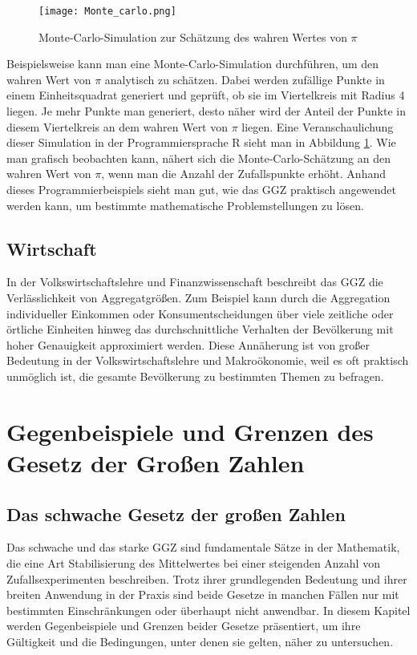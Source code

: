 \documentclass[12pt,a4paper]{article}
\begin{document}
\begin{figure}[h!]
  \centering
  \texttt{[image: Monte\_carlo.png]}
  \caption{Monte-Carlo-Simulation zur Schätzung des wahren Wertes von \texorpdfstring{$\pi$}{π}}
  \label{fig:monte_carlo}
\end{figure}


Beispielsweise kann man eine Monte-Carlo-Simulation durchführen, um den wahren Wert von \texorpdfstring{$\pi$}{π} analytisch zu schätzen.
Dabei werden zufällige Punkte in einem Einheitsquadrat generiert und geprüft, ob sie im Viertelkreis mit Radius 4 liegen.
Je mehr Punkte man generiert, desto näher wird der Anteil der Punkte in diesem Viertelkreis an dem wahren Wert von \texorpdfstring{$\pi$}{π} liegen.
Eine Veranschaulichung dieser Simulation in der Programmiersprache R sieht man in Abbildung \ref{fig:monte_carlo}.
Wie man grafisch beobachten kann, nähert sich die Monte-Carlo-Schätzung an den wahren Wert von \texorpdfstring{$\pi$}{π}, wenn man die Anzahl der Zufallspunkte erhöht.
Anhand dieses Programmierbeispiels sieht man gut, wie das GGZ praktisch angewendet werden kann, um bestimmte mathematische Problemstellungen zu lösen.


\subsection{Wirtschaft}


In der Volkswirtschaftslehre und Finanzwissenschaft beschreibt das GGZ die Verlässlichkeit von Aggregatgrößen.
Zum Beispiel kann durch die Aggregation individueller Einkommen oder Konsumentscheidungen über viele zeitliche oder örtliche Einheiten hinweg das durchschnittliche Verhalten der Bevölkerung mit hoher Genauigkeit approximiert werden.
Diese Annäherung ist von großer Bedeutung in der Volkswirtschaftslehre und Makroökonomie, weil es oft praktisch unmöglich ist, die gesamte Bevölkerung zu bestimmten Themen zu befragen.


\section{Gegenbeispiele und Grenzen des Gesetz der Großen Zahlen}
\label{sec:grenzen}


\subsection{Das schwache Gesetz der großen Zahlen}


Das schwache und das starke GGZ sind fundamentale Sätze in der Mathematik, die eine Art Stabilisierung des Mittelwertes bei einer steigenden Anzahl von Zufallsexperimenten beschreiben.
Trotz ihrer grundlegenden Bedeutung und ihrer breiten Anwendung in der Praxis sind beide Gesetze in manchen Fällen nur mit bestimmten Einschränkungen oder überhaupt nicht anwendbar.
In diesem Kapitel werden Gegenbeispiele und Grenzen beider Gesetze präsentiert, um ihre Gültigkeit und die Bedingungen, unter denen sie gelten, näher zu untersuchen.
\end{document}
